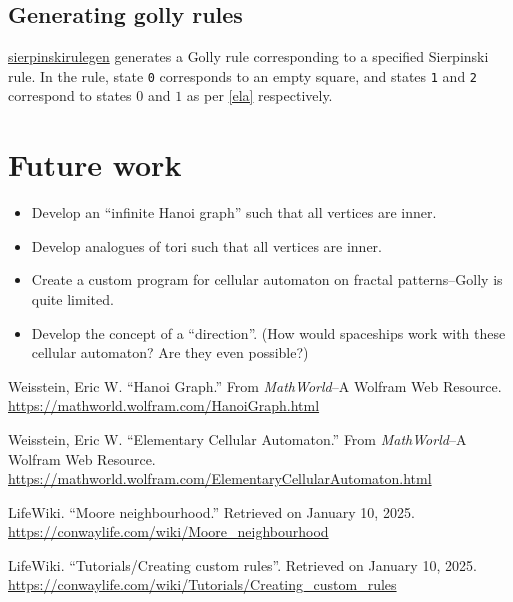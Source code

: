 \documentclass[12pt]{article}
\begin{document}
\subsection{Generating golly rules}
\href{https://github.com/GeethanPfeifer/sierpinski/blob/main/golly/sierpinskirulegen.cpp}{sierpinskirulegen} generates a Golly rule corresponding to a specified Sierpinski rule. In the rule, state \texttt{0} corresponds to an empty square, and states \texttt{1} and \texttt{2} correspond to states $0$ and $1$ as per \ref{ela} respectively.

\section{Future work}
\begin{itemize}
	\item Develop an ``infinite Hanoi graph'' such that all vertices are inner.
	\item Develop analogues of tori such that all vertices are inner.
	\item Create a custom program for cellular automaton on fractal patterns--Golly is quite limited.
	\item Develop the concept of a ``direction''. (How would spaceships work with these cellular automaton? Are they even possible?)

	
\end{itemize}\pagebreak
\begin{thebibliography}{9}
	Weisstein, Eric W. ``Hanoi Graph.'' From \textit{MathWorld}--A Wolfram Web Resource.\\ \url{https://mathworld.wolfram.com/HanoiGraph.html}
	
	Weisstein, Eric W. ``Elementary Cellular Automaton.'' From \textit{MathWorld}--A Wolfram Web Resource. \\\url{https://mathworld.wolfram.com/ElementaryCellularAutomaton.html}
	
	LifeWiki. ``Moore neighbourhood.'' Retrieved on January 10, 2025.\\ \url{https://conwaylife.com/wiki/Moore_neighbourhood}
	
	LifeWiki. ``Tutorials/Creating custom rules''. Retrieved on January 10, 2025.\\
	\url{https://conwaylife.com/wiki/Tutorials/Creating_custom_rules}
\end{thebibliography}
\end{document}
